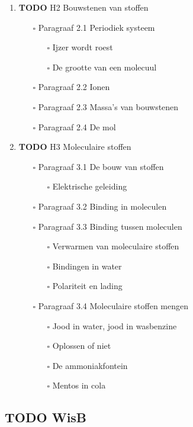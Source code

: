 \documentclass[11pt]{article}
\begin{document}
\begin{enumerate}
\item {\bfseries\sffamily TODO} H2 Bouwstenen van stoffen
\label{sec:org6039b03}
\begin{itemize}
\item[{$\square$}] Paragraaf 2.1 Periodiek systeem
\begin{itemize}
\item[{$\square$}] Ijzer wordt roest
\item[{$\square$}] De grootte van een molecuul
\end{itemize}
\item[{$\square$}] Paragraaf 2.2 Ionen
\item[{$\square$}] Paragraaf 2.3 Massa's van bouwstenen
\item[{$\square$}] Paragraaf 2.4 De mol
\end{itemize}
\item {\bfseries\sffamily TODO} H3 Moleculaire stoffen
\label{sec:org41d9667}
\begin{itemize}
\item[{$\square$}] Paragraaf 3.1 De bouw van stoffen
\begin{itemize}
\item[{$\square$}] Elektrische geleiding
\end{itemize}
\item[{$\square$}] Paragraaf 3.2 Binding in moleculen
\item[{$\square$}] Paragraaf 3.3 Binding tussen moleculen
\begin{itemize}
\item[{$\square$}] Verwarmen van moleculaire stoffen
\item[{$\square$}] Bindingen in water
\item[{$\square$}] Polariteit en lading
\end{itemize}
\item[{$\square$}] Paragraaf 3.4 Moleculaire stoffen mengen
\begin{itemize}
\item[{$\square$}] Jood in water, jood in wasbenzine
\item[{$\square$}] Oplossen of niet
\item[{$\square$}] De ammoniakfontein
\item[{$\square$}] Mentos in cola
\end{itemize}
\end{itemize}
\end{enumerate}
\subsection{{\bfseries\sffamily TODO} WisB}
\label{sec:org7a70e9e}
\end{document}
